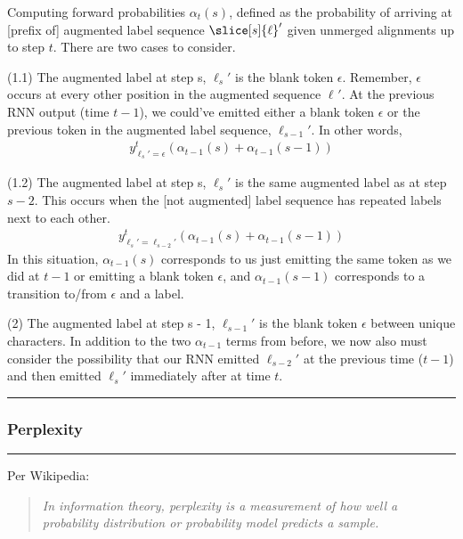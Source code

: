 \documentclass[11pt]{article}
\renewcommand\vec[2][]{\bm{#2}_{#1}}
\newcommand\myspace[1][]{\vspace{#1\bigskipamount}}
\newcommand\p{\Needspace{10\baselineskip} \noindent}
\newcommand\subsub[1]{\Needspace{15\baselineskip}\hrule\subsubsection{#1}\hrule}
\begin{document}
\p Computing forward probabilities $\alpha_t(s)$, defined as the probability of arriving at [prefix of] augmented label sequence $\slice[s]{\ell}'$ given unmerged alignments up to step $t$. There are two cases to consider.
\begin{compactenum}
	\item  (1.1) The augmented label at step s, $\vec[s]{\ell}'$ is the blank token $\epsilon$. Remember, $\epsilon$ occurs at every other position in the augmented sequence $\vec{\ell}'$. At the previous RNN output (time $t - 1$), we could've emitted either a blank token $\epsilon$ or the previous token in the augmented label sequence, $\vec[s - 1]{\ell}'$. In other words, 
	\begin{align}
		y_{ \vec[s]{\ell}'{=}\epsilon}^t \left(   \alpha_{t - 1}(s) + \alpha_{t - 1}(s - 1)   \right)
	\end{align}
	
	\item (1.2) The augmented label at step s, $\vec[s]{\ell}'$ is the same augmented label as at step $s - 2$. This occurs when the [not augmented] label sequence has repeated labels next to each other. 
		\begin{align}
			y_{ \vec[s]{\ell}'{=} \vec[s-2]{\ell}' }^t \left(   \alpha_{t - 1}(s) + \alpha_{t - 1}(s - 1)   \right)
		\end{align}
		In this situation, $\alpha_{t-1}(s)$ corresponds to us just emitting the same token as we did at $t - 1$ or emitting a blank token $\epsilon$, and $\alpha_{t-1}(s - 1)$ corresponds to a transition to/from $\epsilon$ and a label. 
		
	\item (2)  The augmented label at step s - 1, $\vec[s - 1]{\ell}'$ is the blank token $\epsilon$ between unique characters. In addition to the two $\alpha_{t-1}$ terms from before, we now also must consider the possibility that our RNN emitted $\vec[s-2]{\ell}'$ at the previous time ($t-1$) and then emitted $\vec[s]{\ell}'$ immediately after at time $t$.  
\end{compactenum}

\myspace
\subsub{Perplexity}
\myspace

Per Wikipedia:
\begin{quote}
	\vspace{-1em}
	\small\itshape
	In information theory, perplexity is a measurement of how well a probability distribution or probability model predicts a sample.
\end{quote}
\end{document}

